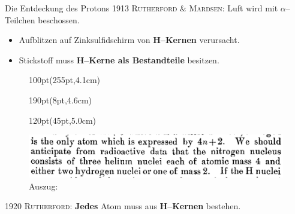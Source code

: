 \documentclass[t,9pt]{beamer}
\newcommand{\highlight}[3]{ \begin{textblock*}{#1}(#2,#3) \begin{tcolorbox} [enhanced,opacityfill=.1,colback=blue] \end{tcolorbox} \end{textblock*} } %
\begin{document}
        \begin{frame}{Die Entdeckung des Protons}
                1913 \textsc{Rutherford \& \textsc{Mardsen}}: Luft wird mit $\alpha $--Teilchen beschossen.
                \begin{itemize}
                        \item Aufblitzen auf Zinksulfidschirm von \textbf{H--Kernen} verursacht.
                        \item Stickstoff muss \textbf{H--Kerne als Bestandteile} besitzen.
                \end{itemize}
                \begin{figure}
                        \highlight{100pt}{255pt}{4.1cm}
                        \highlight{190pt}{8pt}{4.6cm}
                        \highlight{120pt}{45pt}{5.0cm}
                        \includegraphics[width=\textwidth]{prosi_nitrogen_made_of_H.png}
                        \caption{Auszug:\cite{Rutherford1919}}
                \end{figure}
                \vspace{.5cm}1920 \textsc{Rutherford}: \textbf{Jedes} Atom muss aus \textbf{H--Kernen} bestehen.\cite{Rutherford_proton_discovery}
        \end{frame}

\end{document}
